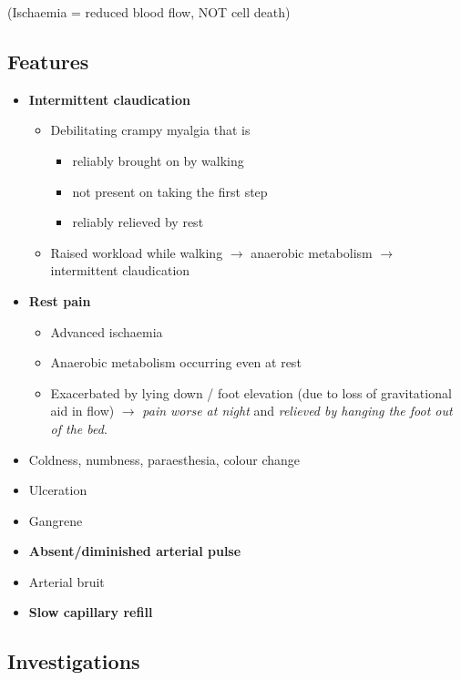 \documentclass[
  12pt,
]{memoir}
\providecommand{\tightlist}{%
  \setlength{\itemsep}{0pt}\setlength{\parskip}{0pt}}
\begin{document}
(Ischaemia = reduced blood flow, NOT cell death)

\hypertarget{features-3}{%
\subsection{Features}\label{features-3}}

\begin{itemize}
\tightlist
\item
  \textbf{Intermittent claudication}

  \begin{itemize}
  \tightlist
  \item
    Debilitating crampy myalgia that is

    \begin{itemize}
    \tightlist
    \item
      reliably brought on by walking
    \item
      not present on taking the first step
    \item
      reliably relieved by rest
    \end{itemize}
  \item
    Raised workload while walking \(\rightarrow\) anaerobic metabolism
    \(\rightarrow\) intermittent claudication
  \end{itemize}
\item
  \textbf{Rest pain}

  \begin{itemize}
  \tightlist
  \item
    Advanced ischaemia
  \item
    Anaerobic metabolism occurring even at rest
  \item
    Exacerbated by lying down / foot elevation (due to loss of
    gravitational aid in flow) \(\rightarrow\) \emph{pain worse at
    night} and \emph{relieved by hanging the foot out of the bed}.
  \end{itemize}
\item
  Coldness, numbness, paraesthesia, colour change
\item
  Ulceration
\item
  Gangrene
\item
  \textbf{Absent/diminished arterial pulse}
\item
  Arterial bruit
\item
  \textbf{Slow capillary refill}
\end{itemize}

\hypertarget{investigations-2}{%
\subsection{Investigations}\label{investigations-2}}
\end{document}
